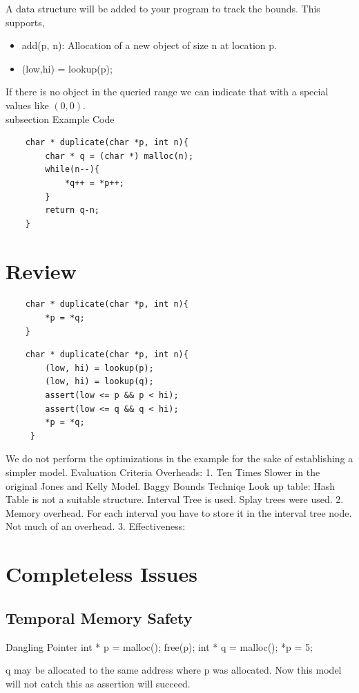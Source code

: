 \documentclass[11pt]{article} %
\begin{document}
A data structure will be added to your program to track the bounds. This supports,
\begin{itemize} \itemsep -2pt
\item add(p, n): Allocation of a new object of size n at location p.
\item (low,hi) = lookup(p);
\end{itemize}
If there is no object in the queried range we can indicate that with a special 
values like $(0,0)$.
\\
subsection {Example Code}
\begin{verbatim}
    char * duplicate(char *p, int n){
        char * q = (char *) malloc(n);
        while(n--){
            *q++ = *p++;
        }
        return q-n;
    }
\end{verbatim}
\section {Review}
\begin{verbatim}
    char * duplicate(char *p, int n){
		*p = *q;
	}
\end{verbatim}



\begin{verbatim}
    char * duplicate(char *p, int n){
        (low, hi) = lookup(p);
        (low, hi) = lookup(q);
        assert(low <= p && p < hi);
        assert(low <= q && q < hi);
        *p = *q;
     }
\end{verbatim}
We do not perform the optimizations in the example for the sake of establishing
a simpler model.
Evaluation Criteria
Overheads:
1. Ten Times Slower in the original Jones and Kelly Model.
Baggy Bounds Techniqe
Look up table: Hash Table is not a suitable structure. Interval Tree is used. Splay trees were used.
2. Memory overhead. For each interval you have to store it in the interval tree node.
Not much of an overhead.
3. Effectiveness:
\section {Completeless Issues}
\subsection {Temporal Memory Safety}
Dangling Pointer
int * p = malloc();
free(p);
int * q = malloc();
*p = 5;

q may be allocated to the same address where p was allocated. Now this model
will not catch this as assertion will succeed.
\end{document}
